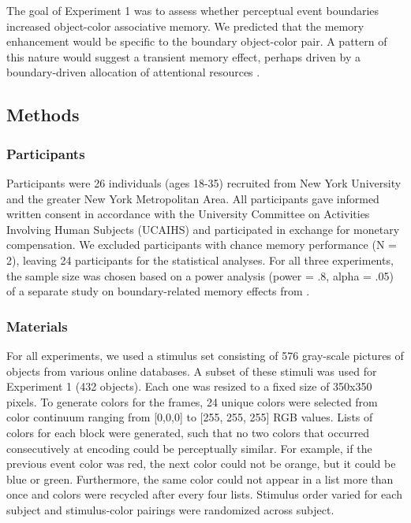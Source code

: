 The goal of Experiment 1 was to assess whether perceptual event
boundaries increased object-color associative memory. We predicted that
the memory enhancement would be specific to the boundary object-color
pair. A pattern of this nature would suggest a transient memory effect,
perhaps driven by a boundary-driven allocation of attentional resources
\autocite{kurby_segmentation_2008}.

\subsection{Methods}\label{methods}

\subsubsection{Participants}\label{participants}

Participants were 26 individuals (ages 18-35) recruited from New York
University and the greater New York Metropolitan Area. All participants
gave informed written consent in accordance with the University
Committee on Activities Involving Human Subjects (UCAIHS) and
participated in exchange for monetary compensation. We excluded
participants with chance memory performance (N = 2), leaving 24
participants for the statistical analyses. For all three experiments,
the sample size was chosen based on a power analysis (power = .8, alpha
= .05) of a separate study on boundary-related memory effects from
\textcite{dubrow_influence_2013}.

\subsubsection{Materials}\label{materials}

For all experiments, we used a stimulus set consisting of 576 gray-scale
pictures of objects from various online databases. A subset of these
stimuli was used for Experiment 1 (432 objects). Each one was resized to
a fixed size of 350x350 pixels. To generate colors for the frames, 24
unique colors were selected from color continuum ranging from
{[}0,0,0{]} to {[}255, 255, 255{]} RGB values. Lists of colors for each
block were generated, such that no two colors that occurred
consecutively at encoding could be perceptually similar. For example, if
the previous event color was red, the next color could not be orange,
but it could be blue or green. Furthermore, the same color could not
appear in a list more than once and colors were recycled after every
four lists. Stimulus order varied for each subject and stimulus-color
pairings were randomized across subject.

